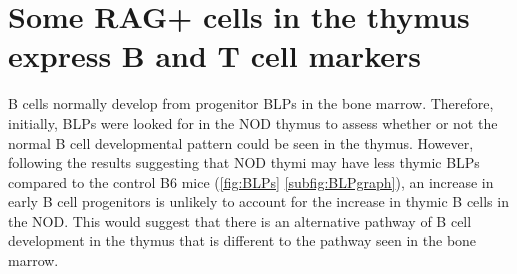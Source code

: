


\section{Some RAG+ cells in the thymus express B and T cell markers}

B cells normally develop from progenitor BLPs in the bone marrow.
Therefore, initially, BLPs were looked for in the NOD thymus to assess whether or not the normal B cell developmental pattern could be seen in the thymus.
However, following the results suggesting that NOD thymi may have less thymic BLPs compared to the control B6 mice (\cref{fig:BLPs} \ref{subfig:BLPgraph}), an increase in early B cell progenitors is unlikely to account for the increase in thymic B cells in the NOD.
This would suggest that there is an alternative pathway of B cell development in the thymus that is different to the pathway seen in the bone marrow.

